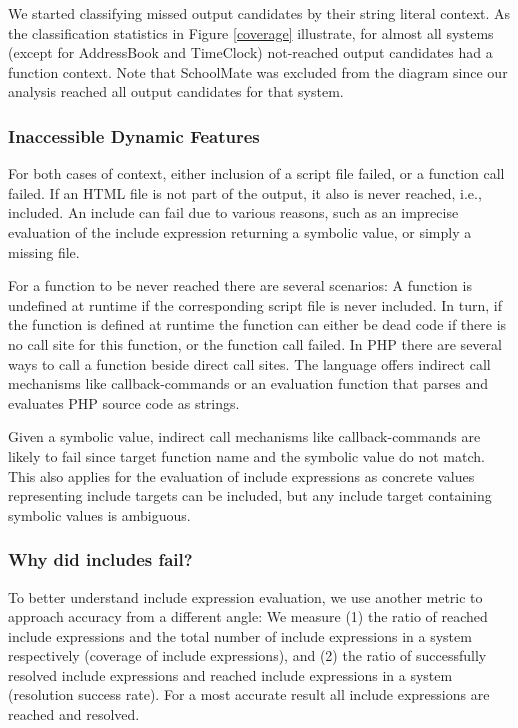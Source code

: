 \documentclass[preprint]{sig-alternate-05-2015}
\begin{document}
We started classifying missed output candidates by their string literal
context. As the classification statistics in Figure \ref{coverage} illustrate,
for almost all systems (except for \textsf{AddressBook} and \textsf{TimeClock})
not-reached output candidates had a function context. Note that
\textsf{SchoolMate} was excluded from the diagram since our analysis reached
all output candidates for that system.

\subsubsection{Inaccessible Dynamic Features}
\label{sec:inaccessible}
For both cases of context, either inclusion of a script file failed, or a
function call failed. If an HTML file is not part of the output, it also is
never reached, i.e., included. An include can fail due to various reasons, such
as an imprecise evaluation of the include expression returning a symbolic
value, or simply a missing file.

For a function to be never reached there are several scenarios: A function is
undefined at runtime if the corresponding script file is never included. In
turn, if the function is defined at runtime the function can either be dead
code if there is no call site for this function, or the function call failed.
In PHP there are several ways to call a function beside direct call sites. The
language offers indirect call mechanisms like callback-commands or an
evaluation function that parses and evaluates PHP source code as strings.

Given a symbolic value, indirect call mechanisms like callback-commands are
likely to fail since target function name and the symbolic value do not match.
This also applies for the evaluation of include expressions as concrete values
representing include targets can be included, but any include target containing
symbolic values is ambiguous.

\subsubsection{Why did includes fail?}
\label{WhyDidIncludesFail}
To better understand include expression evaluation, we use another metric to
approach accuracy from a different angle: We measure (1) the ratio of reached
include expressions and the total number of include expressions in a system
respectively (coverage of include expressions), and (2) the ratio of
successfully resolved include expressions and reached include expressions in a
system (resolution success rate). For a most accurate result all include
expressions are reached and resolved.
\end{document}
